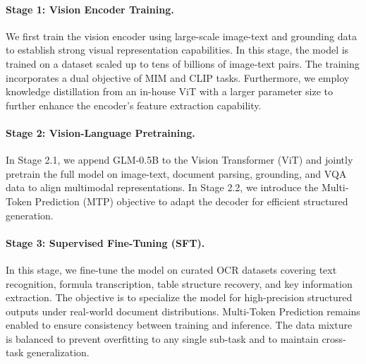 \begin{table}[htbp]
\centering
\caption{Training Recipe for GLM-OCR across different stages.}
\label{tab:training_recipe}
\end{table}

\paragraph{Stage 1: Vision Encoder Training.} We first train the vision encoder using large-scale image-text and grounding data to establish strong visual representation capabilities. In this stage, the model is trained on a dataset scaled up to tens of billions of image-text pairs. The training incorporates a dual objective of MIM and CLIP tasks. Furthermore, we employ knowledge distillation from an in-house ViT with a larger parameter size to further enhance the encoder's feature extraction capability.

\paragraph{Stage 2: Vision-Language Pretraining.} In Stage 2.1, we append GLM-0.5B to the Vision Transformer (ViT) and jointly pretrain the full model on image-text, document parsing, grounding, and VQA data to align multimodal representations. In Stage 2.2, we introduce the Multi-Token Prediction (MTP) objective to adapt the decoder for efficient structured generation.

\paragraph{Stage 3: Supervised Fine-Tuning (SFT).} In this stage, we fine-tune the model on curated OCR datasets covering text recognition, formula transcription, table structure recovery, and key information extraction. The objective is to specialize the model for high-precision structured outputs under real-world document distributions. Multi-Token Prediction remains enabled to ensure consistency between training and inference. The data mixture is balanced to prevent overfitting to any single sub-task and to maintain cross-task generalization.

